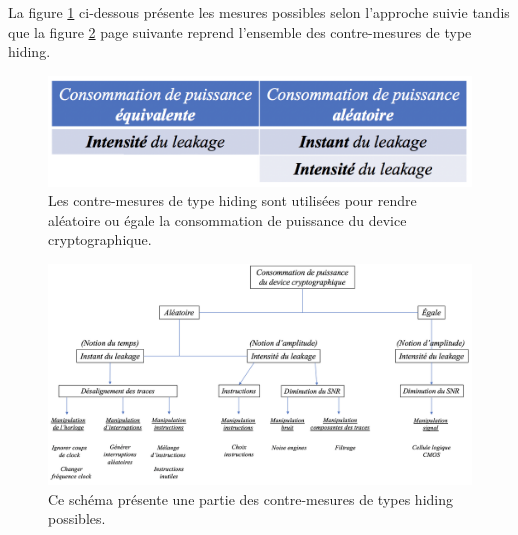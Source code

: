 \documentclass[10pt, oneside, a4paper]{article}
\begin{document}
La figure \ref{fig:hiding} ci-dessous présente les mesures possibles selon l'approche suivie tandis que la figure \ref{fig:resume_hiding} page suivante reprend l'ensemble des contre-mesures de type hiding.

\begin{figure}[htbp]
    \centering
    \includegraphics[scale=0.5]{image/hiding}
    \caption{Les contre-mesures de type hiding sont utilisées pour rendre aléatoire ou égale la consommation de puissance du device cryptographique.}
    \label{fig:hiding} 
\end{figure}

\begin{figure}[htbp]
    \centering
    \includegraphics[scale=0.66, angle=90]{image/resume_hiding}
    \caption{Ce schéma présente une partie des contre-mesures de types hiding possibles.}
    \label{fig:resume_hiding} 
\end{figure}
\end{document}
